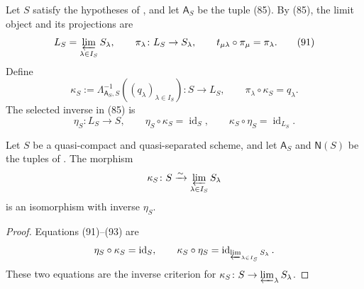 \begin{definition}
  \label{def:nagata-glued-limit-comparison}
  \lean{}

  Let \(S\) satisfy the hypotheses of
  , and let
  \(\mathsf A_S\) be the tuple (85).  By (85), the limit object and its
  projections are
  \[
    L_S=\varprojlim_{\lambda\in I_S}S_\lambda,\qquad
    \pi_\lambda\colon L_S\to S_\lambda,\qquad
    t_{\mu\lambda}\circ\pi_\mu=\pi_\lambda.                         \tag{91}
  \]
  Define
  \[
    \kappa_S
      :=\Lambda_{\mathsf A_S,S}^{-1}
          ((q_\lambda)_{\lambda\in I_S})
      \colon S\longrightarrow L_S,\qquad
    \pi_\lambda\circ\kappa_S=q_\lambda.                             \tag{92}
  \]
  The selected inverse in (85) is
  \[
    \eta_S\colon L_S\to S,\qquad
    \eta_S\circ\kappa_S=\operatorname{id}_S,\qquad
    \kappa_S\circ\eta_S=\operatorname{id}_{L_S}.                    \tag{93}
  \]
\end{definition}

\begin{lemma}
  \label{lemma:nagata-glued-limit-recovery}
  \lean{}

  Let $S$ be a quasi-compact and quasi-separated scheme, and let
  $\mathsf A_S$ and $\mathsf N(S)$ be the tuples of
  .  The morphism
  \[
    \kappa_S\colon S\xrightarrow{\sim}
      \varprojlim_{\lambda\in I_S}S_\lambda
  \]
  is an isomorphism with inverse \(\eta_S\).
\end{lemma}

\begin{proof}
  Equations (91)--(93) are
  \[
    \eta_S\circ\kappa_S=\operatorname{id}_S,\qquad
    \kappa_S\circ\eta_S
      =\operatorname{id}_{\varprojlim_{\lambda\in I_S}S_\lambda}.
  \]
  These two equations are the inverse criterion for
  \(\kappa_S\colon S\to\varprojlim_\lambda S_\lambda\).
\end{proof}

